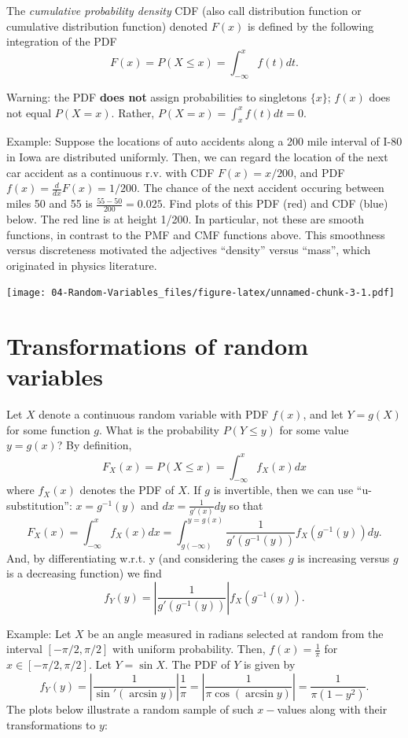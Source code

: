 \documentclass[]{book}
\begin{document}
The \emph{cumulative probability density} CDF (also call distribution
function or cumulative distribution function) denoted \(F(x)\) is
defined by the following integration of the PDF
\[F(x) = P(X\leq x) = \int_{-\infty}^x f(t)dt.\]

Warning: the PDF \textbf{does not} assign probabilities to singletons
\(\{x\}\); \(f(x)\) does not equal \(P(X=x)\). Rather,
\(P(X=x) = \int_x^x f(t)dt = 0\).

Example: Suppose the locations of auto accidents along a 200 mile
interval of I-80 in Iowa are distributed uniformly. Then, we can regard
the location of the next car accident as a continuous r.v. with CDF
\(F(x) = x/200\), and PDF \(f(x) = \frac{d}{dx}F(x) = 1/200\). The
chance of the next accident occuring between miles 50 and 55 is
\(\frac{55-50}{200} = 0.025\). Find plots of this PDF (red) and CDF
(blue) below. The red line is at height 1/200. In particular, not these
are smooth functions, in contrast to the PMF and CMF functions above.
This smoothness versus discreteness motivated the adjectives ``density''
versus ``mass'', which originated in physics literature.

\texttt{[image: 04-Random-Variables\_files/figure-latex/unnamed-chunk-3-1.pdf]}

\section{Transformations of random
variables}\label{transformations-of-random-variables}

Let \(X\) denote a continuous random variable with PDF \(f(x)\), and let
\(Y = g(X)\) for some function \(g\). What is the probability
\(P(Y \leq y)\) for some value \(y = g(x)\)? By definition,
\[F_X(x) = P(X\leq x) = \int_{-\infty}^x f_X(x)dx\] where \(f_X(x)\)
denotes the PDF of \(X\). If \(g\) is invertible, then we can use
``u-substitution'': \(x = g^{-1}(y)\) and \(dx = \frac{1}{g'(x)}dy\) so
that
\[F_X(x) = \int_{-\infty}^x f_X(x)dx = \int_{g(-\infty)}^{y=g(x)} \frac{1}{g'(g^{-1}(y))} f_X(g^{-1}(y))dy.\]
And, by differentiating w.r.t. y (and considering the cases \(g\) is
increasing versus \(g\) is a decreasing function) we find
\[f_Y(y) = \left|\frac{1}{g'(g^{-1}(y))}\right| f_X(g^{-1}(y)).\]

Example: Let \(X\) be an angle measured in radians selected at random
from the interval \([-\pi/2, \pi/2]\) with uniform probability. Then,
\(f(x) = \frac{1}{\pi}\) for \(x \in [-\pi/2, \pi/2]\). Let
\(Y = \sin X\). The PDF of \(Y\) is given by
\[f_Y(y) = \left|\frac{1}{\sin'(\arcsin y)}\right|\frac{1}{\pi} = \left|\frac{1}{\pi\cos(\arcsin y)}\right| = \frac{1}{\pi(1-y^2)}.\]
The plots below illustrate a random sample of such \(x-\)values along
with their transformations to \(y\):
\end{document}
